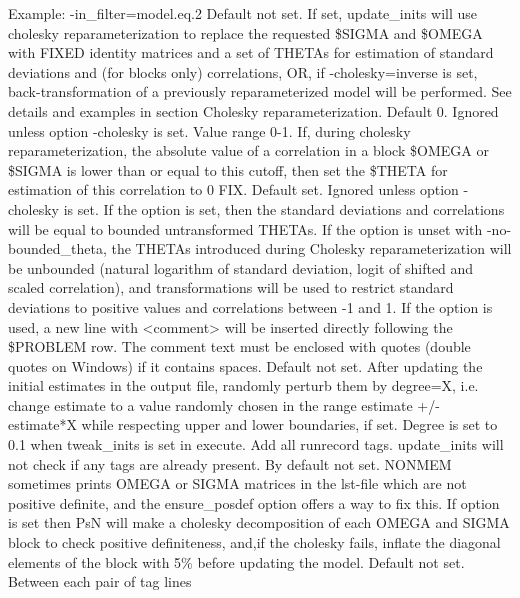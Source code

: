 \begin{optionlist}
Example: -in\_filter=model.eq.2
Default not set.
If set, update\_inits will use cholesky reparameterization to replace the requested
\$SIGMA and \$OMEGA with FIXED identity matrices and a set of THETAs for estimation
of standard deviations and (for blocks only) correlations, OR, if -cholesky=inverse is set,
back-transformation of a previously reparameterized model will be performed. See details and
examples in section Cholesky reparameterization.
\nextopt
{}
Default 0. Ignored unless option -cholesky is set. Value range 0-1.
If, during cholesky reparameterization, the absolute value of a correlation 
in a block \$OMEGA or \$SIGMA is lower than or equal to this cutoff, then set
the \$THETA for estimation of this correlation to 0 FIX.
\nextopt
{}
Default set. Ignored unless option -cholesky is set. 
If the option is set, then the standard deviations and correlations will be equal to bounded untransformed THETAs.
If the option is unset with -no-bounded\_theta, the THETAs introduced during Cholesky reparameterization
will be unbounded (natural logarithm of standard deviation, logit of shifted and scaled correlation),
and transformations will be used to restrict standard deviations to positive values
and correlations between -1 and 1.
\nextopt
{}
If the option is used, a new line with <comment> will be inserted 
directly following the \$PROBLEM row.
The comment text must be enclosed with quotes (double quotes on Windows) 
if it contains spaces.
\nextopt
{}
Default not set. 
After updating the initial estimates in the output file, randomly
perturb them by degree=X, i.e. change estimate to a value
randomly chosen in the range estimate +/- estimate*X while
respecting upper and lower boundaries, if set.
Degree is set to 0.1 when tweak\_inits is set in execute.
\nextopt
{}
Add all runrecord tags. update\_inits will not check if any tags 
are already present.
\nextopt
{}
By default not set. 
NONMEM sometimes prints OMEGA or SIGMA matrices
in the lst-file which are not positive definite, and the 
ensure\_posdef option offers a way to fix this.
If option is set then PsN will make a cholesky decomposition of
each OMEGA and SIGMA block to check positive definiteness, and,if the cholesky fails,
inflate the diagonal elements of the block with 5\% before updating the model.
\nextopt
{}
Default not set. Between each pair of tag lines
\begin{verbatim}

\end{verbatim}
\end{optionlist}
